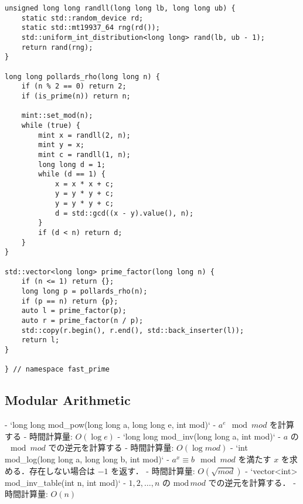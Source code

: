 \begin{lstlisting}
unsigned long long randll(long long lb, long long ub) {
    static std::random_device rd;
    static std::mt19937_64 rng(rd());
    std::uniform_int_distribution<long long> rand(lb, ub - 1);
    return rand(rng);
}

long long pollards_rho(long long n) {
    if (n % 2 == 0) return 2;
    if (is_prime(n)) return n;

    mint::set_mod(n);
    while (true) {
        mint x = randll(2, n);
        mint y = x;
        mint c = randll(1, n);
        long long d = 1;
        while (d == 1) {
            x = x * x + c;
            y = y * y + c;
            y = y * y + c;
            d = std::gcd((x - y).value(), n);
        }
        if (d < n) return d;
    }
}

std::vector<long long> prime_factor(long long n) {
    if (n <= 1) return {};
    long long p = pollards_rho(n);
    if (p == n) return {p};
    auto l = prime_factor(p);
    auto r = prime_factor(n / p);
    std::copy(r.begin(), r.end(), std::back_inserter(l));
    return l;
}

} // namespace fast_prime
\end{lstlisting}

\subsection{Modular Arithmetic}

\begin{small}
\begin{markdown}
- `long long mod\_pow(long long a, long long e, int mod)`
    - $a^e \mod mod$ を計算する
    - 時間計算量: $O(\log e)$
- `long long mod\_inv(long long a, int mod)`
    - $a$ の $\mod mod$ での逆元を計算する
    - 時間計算量: $O(\log mod)$
- `int mod\_log(long long a, long long b, int mod)`
    - $a^x \equiv b \mod mod$ を満たす $x$ を求める．存在しない場合は $-1$ を返す．
    - 時間計算量: $O(\sqrt{mod})$
- `vector<int> mod\_inv\_table(int n, int mod)`
  - $1, 2, \dots, n$ の $\mathrm{mod}\,mod$ での逆元を計算する．
  - 時間計算量: $O(n)$
\end{markdown}
\end{small}

